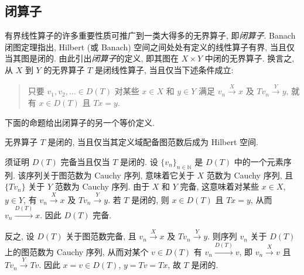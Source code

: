 \subsection{{闭算子}}\label{sec:closed-operators}

{有界线性算子的许多重要性质可推广到一类大得多的无界算子, 即\emph{闭算子}. Banach 闭图定理指出, Hilbert (或 Banach) 空间之间处处有定义的线性算子有界, 当且仅当其图是闭的. 由此引出\emph{闭算子}的定义, 即其图在 $X\times Y$ 中闭的无界算子. 换言之, 从 $X$ 到 $Y$ 的无界算子 $T$ 是闭线性算子, 当且仅当下述条件成立:}

\begin{quote}
{只要 $v_1,v_2,\ldots\in D(T)$ 对某些 $x\in X$ 和 $y\in Y$ 满足 $v_n\xrightarrow{X}x$ 及 $Tv_n\xrightarrow{Y}y$, 就有 $x\in D(T)$ 且 $Tx=y$.}
\end{quote}

{下面的命题给出闭算子的另一个等价定义.}

\begin{Proposition}\label{prop:closed-graph-domain-complete}
{无界算子 $T$ 是闭的, 当且仅当其定义域配备图范数后成为 Hilbert 空间.}
\end{Proposition}

\begin{Proof}
{须证明 $D(T)$ 完备当且仅当 $T$ 是闭的. 设 $\{v_n\}_{n\in\mathbb N}$ 是 $D(T)$ 中的一个元素序列. 该序列关于图范数为 Cauchy 序列, 意味着它关于 $X$ 范数为 Cauchy 序列, 且 $\{Tv_n\}$ 关于 $Y$ 范数为 Cauchy 序列. 由于 $X$ 和 $Y$ 完备, 这意味着对某些 $x\in X$, $y\in Y$, 有 $v_n\xrightarrow{X}x$ 及 $Tv_n\xrightarrow{Y}y$. 若 $T$ 是闭的, 则 $x\in D(T)$ 且 $Tx=y$, 从而 $v_n\xrightarrow{D(T)}x$. 因此 $D(T)$ 完备.}

{反之, 设 $D(T)$ 关于图范数完备, 且 $v_n\xrightarrow{X}x$ 及 $Tv_n\xrightarrow{Y}y$. 则序列 $v_n$ 关于 $D(T)$ 上的图范数为 Cauchy 序列, 从而对某个 $v\in D(T)$ 有 $v_n\xrightarrow{D(T)}v$, 即 $v_n\xrightarrow{X}v$ 且 $Tv_n\xrightarrow{Y}Tv$. 因此 $x=v\in D(T)$, $y=Tv=Tx$, 故 $T$ 是闭的.}
\end{Proof}
